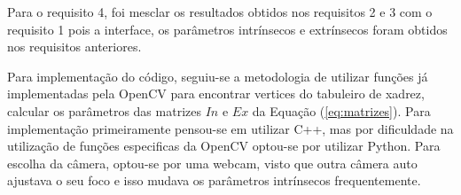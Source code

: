 Para o requisito 4, foi mesclar os resultados obtidos nos requisitos 2 e 3 com o requisito 1 pois a interface, os parâmetros intrínsecos e extrínsecos foram obtidos nos requisitos anteriores.

Para implementação do código, seguiu-se a metodologia de utilizar funções já implementadas pela OpenCV para encontrar vertices do tabuleiro de xadrez, calcular os parâmetros das matrizes $In$ e $Ex$ da Equação (\ref{eq:matrizes}). Para implementação primeiramente pensou-se em utilizar C++, mas por dificuldade na utilização de funções especificas da OpenCV optou-se por utilizar Python. Para escolha da câmera, optou-se por uma webcam, visto que outra câmera auto ajustava o seu foco e isso mudava os parâmetros intrínsecos frequentemente.